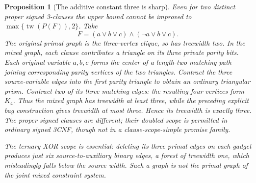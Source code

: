 \documentclass[11pt]{article}
\newtheorem{proposition}[theorem]{Proposition}
\begin{document}
\begin{proposition}[The additive constant three is sharp]
Even for two \emph{distinct} proper signed 3-clauses the upper bound cannot be improved to $\max\{\operatorname{tw}(P(F)),2\}$. Take
\[
F=(a\vee b\vee c)\wedge(\neg a\vee b\vee c).
\]
The original primal graph is the three-vertex clique, so has treewidth two. In the mixed graph, each clause contributes a triangle on its three private parity bits. Each original variable $a,b,c$ forms the center of a length-two matching path joining corresponding parity vertices of the two triangles. Contract the three source-variable edges into the first parity triangle to obtain an ordinary triangular prism. Contract two of its three matching edges: the resulting four vertices form $K_4$. Thus the mixed graph has treewidth at least three, while the preceding explicit bag construction gives treewidth at most three. Hence its treewidth is exactly three. The proper signed clauses are different; their doubled scope is permitted in ordinary signed 3CNF, though not in a clause-scope-simple promise family.

The ternary XOR scope is essential: deleting its three primal edges on each gadget produces just six source-to-auxiliary binary edges, a forest of treewidth one, which misleadingly falls below the source width. Such a graph is \emph{not} the primal graph of the joint mixed constraint system.
\end{proposition}
\end{document}

